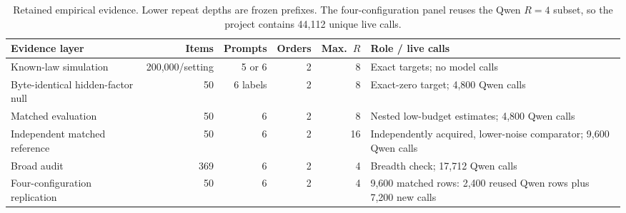 \begin{table}[t]
\centering
\setlength{\tabcolsep}{4.8pt}
\begin{tabular}{lrrrrp{}}
\toprule
Evidence layer & Items & Prompts & Orders & Max.\ $R$ & Role / live calls \\
\midrule
Known-law simulation & 200,000/setting & 5 or 6 & 2 & 8 &
Exact targets; no model calls \\
Byte-identical hidden-factor null & 50 & 6 labels & 2 & 8 &
Exact-zero target; 4,800 Qwen calls \\
Matched evaluation & 50 & 6 & 2 & 8 &
Nested low-budget estimates; 4,800 Qwen calls \\
Independent matched reference & 50 & 6 & 2 & 16 &
Independently acquired, lower-noise comparator; 9,600 Qwen calls \\
Broad audit & 369 & 6 & 2 & 4 &
Breadth check; 17,712 Qwen calls \\
Four-configuration replication & 50 & 6 & 2 & 4 &
9,600 matched rows: 2,400 reused Qwen rows plus 7,200 new calls \\
\bottomrule
\end{tabular}
\caption{Retained empirical evidence. Lower repeat depths are frozen prefixes.
The four-configuration panel reuses the Qwen $R=4$ subset, so the project
contains 44,112 unique live calls.}
\label{tab:study-design}
\end{table}
